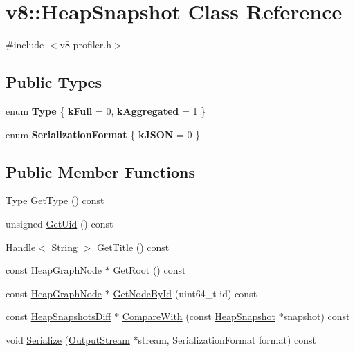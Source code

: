 \hypertarget{classv8_1_1_heap_snapshot}{}\section{v8\+:\+:Heap\+Snapshot Class Reference}
\label{classv8_1_1_heap_snapshot}


{\ttfamily \#include $<$v8-\/profiler.\+h$>$}

\subsection*{Public Types}
\begin{DoxyCompactItemize}
\item 
\hypertarget{classv8_1_1_heap_snapshot_ac199f9738b2143064af09e50a48b466d}{}enum {\bfseries Type} \{ {\bfseries k\+Full} = 0, 
{\bfseries k\+Aggregated} = 1
 \}\label{classv8_1_1_heap_snapshot_ac199f9738b2143064af09e50a48b466d}

\item 
\hypertarget{classv8_1_1_heap_snapshot_a8ed7909568af85f7a36ef5f4da4dd495}{}enum {\bfseries Serialization\+Format} \{ {\bfseries k\+J\+S\+O\+N} = 0
 \}\label{classv8_1_1_heap_snapshot_a8ed7909568af85f7a36ef5f4da4dd495}

\end{DoxyCompactItemize}
\subsection*{Public Member Functions}
\begin{DoxyCompactItemize}
\item 
Type \hyperlink{classv8_1_1_heap_snapshot_a7df9a046a19b97284105c854abf961f3}{Get\+Type} () const 
\item 
unsigned \hyperlink{classv8_1_1_heap_snapshot_a8096d1dc0b99fbffc0f0618be8472ca7}{Get\+Uid} () const 
\item 
\hyperlink{classv8_1_1_handle}{Handle}$<$ \hyperlink{classv8_1_1_string}{String} $>$ \hyperlink{classv8_1_1_heap_snapshot_a54d5d9e0234c2ee361892ea598624a82}{Get\+Title} () const 
\item 
const \hyperlink{classv8_1_1_heap_graph_node}{Heap\+Graph\+Node} $\ast$ \hyperlink{classv8_1_1_heap_snapshot_aafd7abe35ce29f9874de6687c65bf2af}{Get\+Root} () const 
\item 
const \hyperlink{classv8_1_1_heap_graph_node}{Heap\+Graph\+Node} $\ast$ \hyperlink{classv8_1_1_heap_snapshot_a3419c416f5ff050943f90ff63d6cdc65}{Get\+Node\+By\+Id} (uint64\+\_\+t id) const 
\item 
const \hyperlink{classv8_1_1_heap_snapshots_diff}{Heap\+Snapshots\+Diff} $\ast$ \hyperlink{classv8_1_1_heap_snapshot_ae389ce901c547411e8bbd45a61d828cc}{Compare\+With} (const \hyperlink{classv8_1_1_heap_snapshot}{Heap\+Snapshot} $\ast$snapshot) const 
\item 
void \hyperlink{classv8_1_1_heap_snapshot_acf7383deaa06fab1d948fd7e737ac7d3}{Serialize} (\hyperlink{classv8_1_1_output_stream}{Output\+Stream} $\ast$stream, Serialization\+Format format) const 
\end{DoxyCompactItemize}


